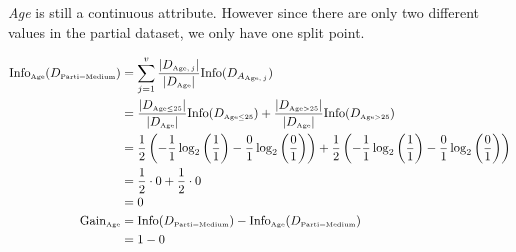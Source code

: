 \documentclass[
english,
smallborders
]{i6prcsht}
\newcommand{\OfSpecificValue}[3]{_{\text{\tiny #1#2#3}}}
\newcommand{\OfAttribute}[1]{_{\text{\tiny #1}}}
\begin{document}
\begin{solution}
\begin{enumerate}
\begin{enumerate}
\begin{enumerate}
\begin{enumerate}
					                        \textit{Age} is still a continuous attribute. However since there are only two different values in the partial dataset, we only have one split point.

					                        \begin{alignat*}{2}
						                        \text{Info}\OfAttribute{Age}(D\OfSpecificValue{Parti}{=}{Medium}) & = \sum_{j=1}^v \frac{|D\OfAttribute{Age$,j$}|}{|D\OfAttribute{Age}|} \text{Info}(D_{A\OfAttribute{Age$,j$}})                                                                                                                            \\
						                                                                                          & = \frac{|D\OfSpecificValue{Age}{$\leq$}{25}|}{|D\OfAttribute{Age}|} \text{Info}(D\OfSpecificValue{Age}{$\leq$}{25}) + \frac{|D\OfSpecificValue{Age}{$>$}{25}|}{|D\OfAttribute{Age}|} \text{Info}(D\OfSpecificValue{Age}{$>$}{25})       \\
						                                                                                          & = \frac{1}{2} \left(-\frac{1}{1} \log_2\left(\frac{1}{1}\right) - \frac{0}{1} \log_2\left(\frac{0}{1}\right)\right) + \frac{1}{2} \left(-\frac{1}{1} \log_2\left(\frac{1}{1}\right) - \frac{0}{1} \log_2\left(\frac{0}{1}\right)\right) \\
						                                                                                          & = \frac{1}{2} \cdot 0 + \frac{1}{2} \cdot 0                                                                                                                                                                                             \\
						                                                                                          & = 0                                                                                                                                                                                                                                     \\
						                        \text{Gain}\OfAttribute{Age}                                      & = \text{Info}(D\OfSpecificValue{Parti}{=}{Medium}) - \text{Info}\OfAttribute{Age}(D\OfSpecificValue{Parti}{=}{Medium})                                                                                                                  \\
						                                                                                          & = 1 - 0                                                                                                                                                                                                                                 \\

\end{alignat*}
\end{enumerate}
\end{enumerate}
\end{enumerate}
\end{enumerate}
\end{solution}
\end{document}
